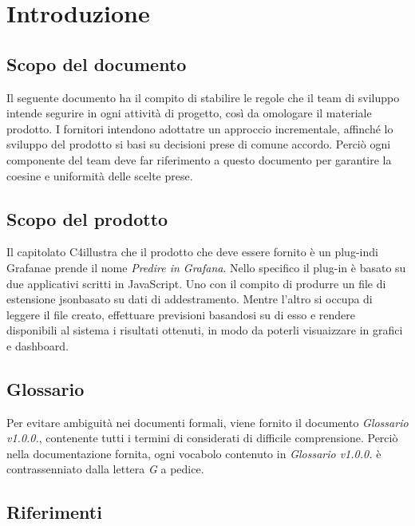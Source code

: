 \section{Introduzione}

\subsection{Scopo del documento}
Il seguente documento ha il compito di stabilire le regole che il team di sviluppo intende segurire in ogni attività di progetto, così da omologare il materiale prodotto.
I fornitori intendono adottatre un approccio incrementale\glo, affinché lo sviluppo del prodotto si basi su decisioni prese di comune accordo. Perciò ogni componente del team deve far riferimento a questo documento per garantire la coesine e uniformità delle scelte prese.

\subsection{Scopo del prodotto}
Il capitolato {C4}\glo illustra che il prodotto che deve essere fornito è un plug-in\glo    di Grafana\glo e prende il nome \textit{Predire in Grafana}. Nello specifico il plug-in è basato su due applicativi scritti in JavaScript\glo. Uno con il compito di produrre un file  di estensione json\glo basato su dati di addestramento\glo{}. Mentre l'altro  si occupa di leggere il file creato, effettuare previsioni basandosi su di esso e rendere disponibili al sistema i risultati ottenuti, in modo da poterli 	visuaizzare in grafici e dashboard.
\subsection{Glossario}
Per evitare ambiguità nei documenti formali, viene fornito il documento \textit{Glossario v1.0.0.}, contenente tutti i termini di considerati di difficile comprensione. Perciò nella documentazione fornita, ogni vocabolo contenuto in \textit{Glossario v1.0.0.} è contrassenniato dalla lettera \textit{G} a pedice.
\subsection{Riferimenti}